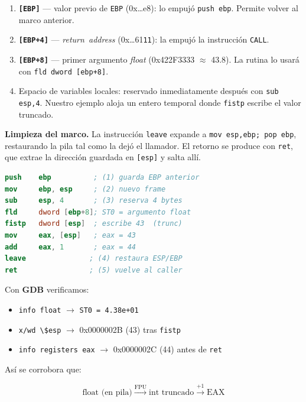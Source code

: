 \documentclass[a4paper,12pt]{article}
\begin{document}
\begin{enumerate}
  \item \textbf{\texttt{[EBP]}} — valor previo de \texttt{EBP} (0x\ldots{}e8):
        lo empujó \lstinline{push ebp}. Permite volver al marco anterior.
  \item \textbf{\texttt{[EBP+4]}} — \emph{return address}
        (0x\ldots{}61\texttt{11}): la empujó la instrucción \texttt{CALL}.
  \item \textbf{\texttt{[EBP+8]}} — primer argumento
        \textit{float} (0x422F3333 $\approx$ 43.8).  
        La rutina lo usará con \lstinline{fld dword [ebp+8]}.
  \item Espacio de variables locales: reservado inmediatamente
        después con \lstinline{sub esp,4}. Nuestro ejemplo aloja un entero
        temporal donde \lstinline{fistp} escribe el valor truncado.
\end{enumerate}
\newpage
\vspace{0.5em}
\noindent
\textbf{Limpieza del marco.} La instrucción
\lstinline{leave} expande a \lstinline{mov esp,ebp; pop ebp},
restaurando la pila tal como la dejó el llamador.
El retorno se produce con \lstinline{ret}, que
extrae la dirección guardada en \texttt{[esp]} y salta allí.

\begin{lstlisting}[language=NASM,caption={Fragmento clave de calculate_gini_int.asm}]
push    ebp          ; (1) guarda EBP anterior
mov     ebp, esp     ; (2) nuevo frame
sub     esp, 4       ; (3) reserva 4 bytes
fld     dword [ebp+8]; ST0 = argumento float
fistp   dword [esp]  ; escribe 43  (trunc)
mov     eax, [esp]   ; eax = 43
add     eax, 1       ; eax = 44
leave               ; (4) restaura ESP/EBP
ret                 ; (5) vuelve al caller
\end{lstlisting}

Con \textbf{GDB} verificamos:

\begin{itemize}
  \item \lstinline{info float} $\rightarrow$ \texttt{ST0 = 4.38e+01}
  \item \lstinline{x/wd \$esp} $\rightarrow$ 0x0000002B (43) tras \texttt{fistp}
  \item \lstinline{info registers eax} $\rightarrow$ 0x0000002C (44) antes de \texttt{ret}
\end{itemize}

Así se corrobora que:

\[
  \boxed{\text{float (en pila)} \xrightarrow{\text{FPU}} \text{int truncado} \xrightarrow{+1} \text{EAX}}
\]
\end{document}
